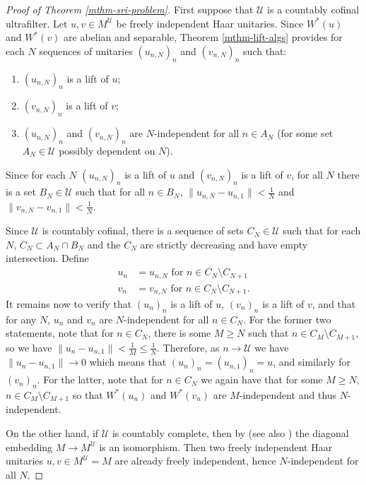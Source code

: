\documentclass[10pt]{amsart}
\numberwithin{equation}{section}
\theoremstyle{definition}
\newcommand{\cU}{\mathcal{U}}
\begin{document}
\begin{proof}[Proof of Theorem \ref{mthm-sri-problem}]
    
    First suppose that $\cU$ is a countably cofinal ultrafilter. Let $u,v\in M^\cU$ be freely independent Haar unitaries. Since $W^*(u)$ and $W^*(v)$ are abelian and separable, Theorem \ref{mthm-lift-algs} provides for each $N$ sequences of unitaries $(u_{n,N})_n$ and $(v_{n,N})_n$ such that: 
    \begin{enumerate}
        \item $(u_{n,N})_n$ is a lift of $u$;
        \item $(v_{n,N})_n$ is a lift of $v$;
        \item $(u_{n,N})_n$ and $(v_{n,N})_n$ are $N$-independent for all $n \in A_N$ (for some set $A_N\in\cU$ possibly dependent on $N$). 
    \end{enumerate}
    Since for each $N$ $(u_{n,N})_n$ is a lift of $u$ and $(v_{n,N})_n$ is a lift of $v$, for all $N$ there is a set $B_N\in\cU$ such that for all $n\in B_N$, $\|u_{n,N} - u_{n,1}\| < \frac1N$ and $\|v_{n,N}-v_{n,1}\|<\frac1N$. 

    Since $\cU$ is countably cofinal, there is a sequence of sets $C_N \in\cU$ such that for each $N$, $C_N \subset A_N\cap B_N$ and the $C_N$ are strictly decreasing and have empty intersection. Define
    \begin{align*}
        u_n &= u_{n,N} \text{ for } n\in C_N\setminus C_{N+1} \\
        v_n &= v_{n,N} \text{ for } n\in C_N\setminus C_{N+1}.
    \end{align*}
    It remains now to verify that $(u_n)_n$ is a lift of $u$, $(v_n)_n$ is a lift of $v$, and that for any $N$, $u_n$ and $v_n$ are $N$-independent for all $n\in C_N$. For the former two statements, note that for $ n\in C_N$, there is some $M\ge N$ such that $n \in C_M\setminus C_{M+1}$, so we have $\|u_n-u_{n,1}\| < \frac1M \le \frac1N$. Therefore, as $n\to\cU$ we have $\|u_n - u_{n,1}\| \to 0$ which means that $(u_n)_n = (u_{n,1})_n = u$, and similarly for $(v_n)_n$. For the latter, note that for $n\in C_N$ we again have that for some $M\ge N,$ $n\in C_{M}\setminus C_{M+1}$ so that $W^*(u_n)$ and $W^*(v_n)$ are $M$-independent and thus $N$-independent.

    On the other hand, if $\cU$ is countably complete, then by \cite[Lemma~2.3]{boutonnet:hal-01450072} (see also \cite[Proposition~6.1(2)]{ge2001ultraproducts}) the diagonal embedding $M\to M^\cU$ is an isomorphism. Then two freely independent Haar unitaries $u,v\in M^\cU = M$ are already freely independent, hence $N$-independent for all $N$.
\end{proof}

    





\end{document}
